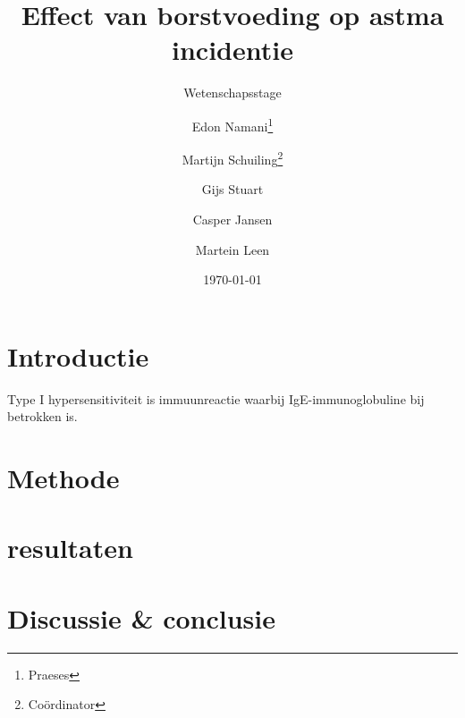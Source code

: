 \documentclass[abstract=true]{scrartcl}
\title{Effect van borstvoeding op astma incidentie}
\subtitle{Wetenschapsstage}
\author{Edon Namani\thanks{Praeses} \and Martijn Schuiling\thanks{Co\"ordinator} \and Gijs Stuart \and Casper Jansen \and Martein Leen}
\date{\today}
\begin{document}
\maketitle
    \begin{abstract}
        \blindtext
    \end{abstract}

\section{Introductie}
Type I hypersensitiviteit is immuunreactie waarbij IgE-immunoglobuline bij betrokken is\cite{abbas2017cellular}.

\section{Methode}

\section{resultaten}

\section{Discussie \& conclusie}

\printbibliography
\end{document}
